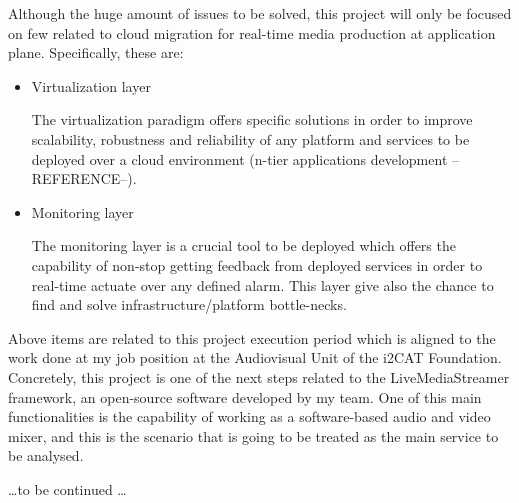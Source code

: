 Although the huge amount of issues to be solved, this project will only be focused on few related to cloud migration for real-time media production at application plane. Specifically, these are:

\begin{itemize}
\item Virtualization layer \hfill 

The virtualization paradigm offers specific solutions in order to improve scalability, robustness and reliability of any platform and services to be deployed over a cloud environment (n-tier applications development --REFERENCE--). 

\item Monitoring layer \hfill 

The monitoring layer is a crucial tool to be deployed which offers the capability of non-stop getting feedback from deployed services in order to real-time actuate over any defined alarm. This layer give also the chance to find and solve infrastructure/platform bottle-necks.
\end{itemize}

Above items are related to this project execution period which is aligned to the work done at my job position at the Audiovisual Unit of the i2CAT Foundation. Concretely, this project is one of the next steps related to the LiveMediaStreamer framework, an open-source software developed by my team. One of this main functionalities is the capability of working as a software-based audio and video mixer, and this is the scenario that is going to be treated as the main service to be analysed.

\ldots to be continued \ldots








